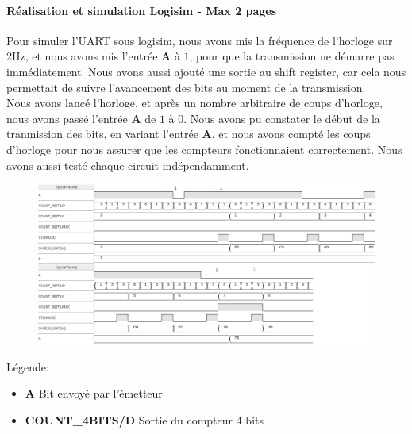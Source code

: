 \documentclass[a4paper]{article} %
\begin{document}
\begin{tcolorbox}[colframe=Monokaimagenta,colback=white]
\paragraph{Réalisation et simulation Logisim - Max 2 pages}
Pour simuler l'UART sous logisim, nous avons mis la fréquence de l'horloge sur 2Hz, et nous avons mis l'entrée \textbf{A} à $1$, pour que la transmission ne démarre pas immédiatement. Nous avons aussi ajouté une sortie au shift register, car cela nous permettait de suivre l'avancement des bits au moment de la transmission.\\
Nous avons lancé l'horloge, et après un nombre arbitraire de coups d'horloge, nous avons passé l'entrée \textbf{A} de $1$ à $0$. Nous avons pu constater le début de la tranmission des bits, en variant l'entrée \textbf{A}, et nous avons compté les coups d'horloge pour nous assurer que les compteurs fonctionnaient correctement.
Nous avons aussi testé chaque circuit indépendamment.
\\
\begin{figure}[H]
\centering
    \includegraphics[width=1\textwidth]{src/CHRONO_UART_1.png}
    \label{fig:countBase}
\end{figure}
Légende:
\begin{itemize}
    \item     \textbf{A} Bit envoyé par l'émetteur
    \item     \textbf{COUNT\_4BITS/D} Sortie du compteur 4 bits

\end{itemize}
\end{tcolorbox}
\end{document}
